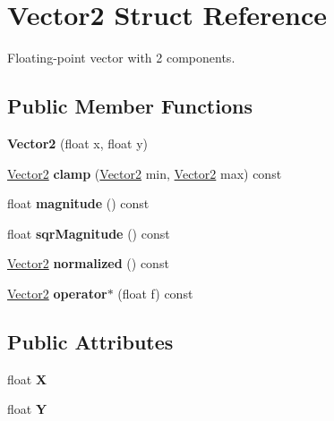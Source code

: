 \hypertarget{structVector2}{\section{Vector2 Struct Reference}
\label{structVector2}
}


Floating-\/point vector with 2 components.  


\subsection*{Public Member Functions}
\begin{DoxyCompactItemize}
\item 
\hypertarget{structVector2_a061ab58a0e216c759d64e3746d712b12}{{\bfseries Vector2} (float x, float y)}\label{structVector2_a061ab58a0e216c759d64e3746d712b12}

\item 
\hypertarget{structVector2_af7448e87dc7ff714886978e140005f12}{\hyperlink{structVector2}{Vector2} {\bfseries clamp} (\hyperlink{structVector2}{Vector2} min, \hyperlink{structVector2}{Vector2} max) const }\label{structVector2_af7448e87dc7ff714886978e140005f12}

\item 
\hypertarget{structVector2_af62b2848ac27312a770905a9d06a3615}{float {\bfseries magnitude} () const }\label{structVector2_af62b2848ac27312a770905a9d06a3615}

\item 
\hypertarget{structVector2_aa89c5901cfc2b90213279a576eaef85a}{float {\bfseries sqr\-Magnitude} () const }\label{structVector2_aa89c5901cfc2b90213279a576eaef85a}

\item 
\hypertarget{structVector2_a2c37a6395d6e718521c2443379fa7679}{\hyperlink{structVector2}{Vector2} {\bfseries normalized} () const }\label{structVector2_a2c37a6395d6e718521c2443379fa7679}

\item 
\hypertarget{structVector2_ae62c0a280cd3024ddb3fcc84b421ce26}{\hyperlink{structVector2}{Vector2} {\bfseries operator$\ast$} (float f) const }\label{structVector2_ae62c0a280cd3024ddb3fcc84b421ce26}

\end{DoxyCompactItemize}
\subsection*{Public Attributes}
\begin{DoxyCompactItemize}
\item 
\hypertarget{structVector2_ae01506fa3d0fb79821bee7445a0c7baf}{float {\bfseries X}}\label{structVector2_ae01506fa3d0fb79821bee7445a0c7baf}

\item 
\hypertarget{structVector2_ab79dce0b924a27a639e0a3cb82b20cec}{float {\bfseries Y}}\label{structVector2_ab79dce0b924a27a639e0a3cb82b20cec}

\end{DoxyCompactItemize}


